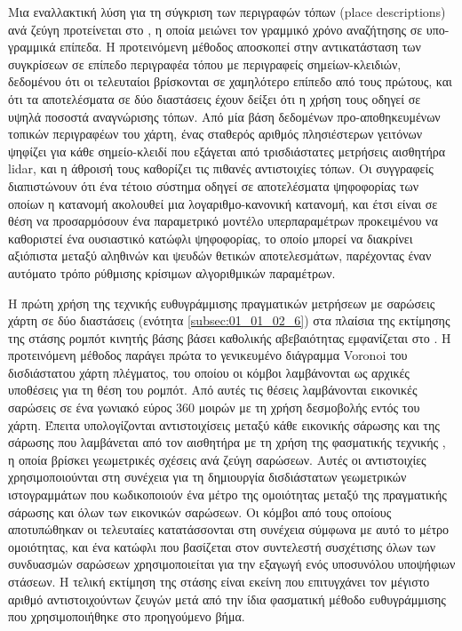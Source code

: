 Μια εναλλακτική λύση για τη σύγκριση των περιγραφών τόπων (place descriptions)
ανά ζεύγη προτείνεται στο \cite{Bosse2013}, η οποία μειώνει τον γραμμικό χρόνο
αναζήτησης σε υπο-γραμμικά επίπεδα. Η προτεινόμενη μέθοδος αποσκοπεί στην
αντικατάσταση των συγκρίσεων σε επίπεδο περιγραφέα τόπου με περιγραφείς
σημείων-κλειδιών, δεδομένου ότι οι τελευταίοι βρίσκονται σε χαμηλότερο επίπεδο
από τους πρώτους, και ότι τα αποτελέσματα σε δύο διαστάσεις έχουν δείξει ότι η
χρήση τους οδηγεί σε υψηλά ποσοστά αναγνώρισης τόπων. Από μία βάση δεδομένων
προ-αποθηκευμένων τοπικών περιγραφέων του χάρτη, ένας σταθερός αριθμός
πλησιέστερων γειτόνων ψηφίζει για κάθε σημείο-κλειδί που εξάγεται από
τρισδιάστατες μετρήσεις αισθητήρα lidar, και η άθροισή τους καθορίζει τις πιθανές
αντιστοιχίες τόπων. Οι συγγραφείς διαπιστώνουν ότι ένα τέτοιο σύστημα οδηγεί σε
αποτελέσματα ψηφοφορίας των οποίων η κατανομή ακολουθεί μια λογαριθμο-κανονική
κατανομή, και έτσι είναι σε θέση να προσαρμόσουν ένα παραμετρικό μοντέλο
υπερπαραμέτρων προκειμένου να καθοριστεί ένα ουσιαστικό κατώφλι ψηφοφορίας, το
οποίο μπορεί να διακρίνει αξιόπιστα μεταξύ αληθινών και ψευδών θετικών
αποτελεσμάτων, παρέχοντας έναν αυτόματο τρόπο ρύθμισης κρίσιμων αλγοριθμικών
παραμέτρων.

Η πρώτη χρήση της τεχνικής ευθυγράμμισης πραγματικών μετρήσεων με σαρώσεις
χάρτη σε δύο διαστάσεις (ενότητα \ref{subsec:01_01_02_6}) στα πλαίσια της
εκτίμησης της στάσης ρομπότ κινητής βάσης βάσει καθολικής αβεβαιότητας
εμφανίζεται στο \cite{Park2014a}. Η προτεινόμενη μέθοδος παράγει πρώτα το
γενικευμένο διάγραμμα Voronoi του δισδιάστατου χάρτη πλέγματος, του οποίου οι
κόμβοι λαμβάνονται ως αρχικές υποθέσεις για τη θέση του ρομπότ. Από αυτές τις
θέσεις λαμβάνονται εικονικές σαρώσεις σε ένα γωνιακό εύρος $360$ μοιρών με τη
χρήση δεσμοβολής εντός του χάρτη. Έπειτα υπολογίζονται αντιστοιχίσεις μεταξύ
κάθε εικονικής σάρωσης και της σάρωσης που λαμβάνεται από τον αισθητήρα με τη
χρήση της φασματικής τεχνικής \cite{Leordeanu2005a}, η οποία βρίσκει
γεωμετρικές σχέσεις ανά ζεύγη σαρώσεων. Αυτές οι αντιστοιχίες χρησιμοποιούνται
στη συνέχεια για τη δημιουργία δισδιάστατων γεωμετρικών ιστογραμμάτων που
κωδικοποιούν ένα μέτρο της ομοιότητας μεταξύ της πραγματικής σάρωσης και όλων
των εικονικών σαρώσεων.  Οι κόμβοι από τους οποίους αποτυπώθηκαν οι τελευταίες
κατατάσσονται στη συνέχεια σύμφωνα με αυτό το μέτρο ομοιότητας, και ένα κατώφλι
που βασίζεται στον συντελεστή συσχέτισης όλων των συνδυασμών σαρώσεων
χρησιμοποιείται για την εξαγωγή ενός υποσυνόλου υποψήφιων στάσεων. Η τελική
εκτίμηση της στάσης είναι εκείνη που επιτυγχάνει τον μέγιστο αριθμό
αντιστοιχούντων ζευγών μετά από την ίδια φασματική μέθοδο ευθυγράμμισης που
χρησιμοποιήθηκε στο προηγούμενο βήμα.

